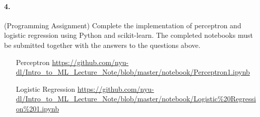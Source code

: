 \documentclass{article}
\begin{document}
\vspace{5mm}



\paragraph{4.} (Programming Assignment)
Complete the implementation of perceptron and logistic regression using Python
and scikit-learn. The completed notebooks must be submitted together with the
answers to the questions above. 
\begin{itemize}
    \item[Perceptron]
        \url{https://github.com/nyu-dl/Intro_to_ML_Lecture_Note/blob/master/notebook/Perceptron1.ipynb}
    \item[Logistic Regression]
        \url{https://github.com/nyu-dl/Intro_to_ML_Lecture_Note/blob/master/notebook/Logistic%20Regression%201.ipynb}
\end{itemize}





%
%
\end{document}
